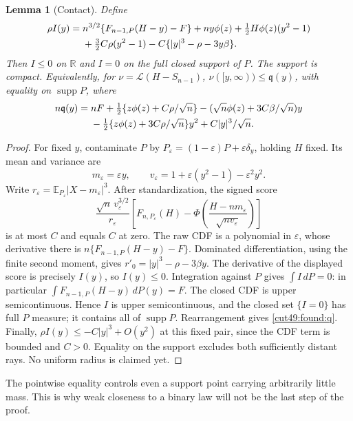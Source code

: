 \documentclass[11pt,a4paper]{article}
\numberwithin{equation}{section}
\newtheorem{lemma}[theorem]{Lemma}
\theoremstyle{definition}
\theoremstyle{remark}
\newcommand{\E}{\mathbb E}
\newcommand{\R}{\mathbb R}
\DeclareMathOperator{\supp}{supp}
\begin{document}
\begin{lemma}[Contact]\label{cut49:global:contact}\label{cut49:found:majorant}
Define
\begin{align}
 \rho I(y)={}&n^{3/2}\{F_{n-1,P}(H-y)-F\}+ny\phi(z)
 +\tfrac12H\phi(z)(y^2-1)\notag\\
 &+\tfrac32C\rho(y^2-1)-C\{|y|^3-\rho-3y\beta\}.
 \label{cut49:found:influence}
\end{align}
Then $I\le0$ on $\R$ and $I=0$ on the full closed support of $P$.
The support is compact. Equivalently, for $\nu=\mathcal L(H-S_{n-1})$,
$\nu([y,\infty))\le\mathfrak q(y)$, with equality on $\supp P$, where
\begin{align}
 n\mathfrak q(y)={}&nF+\tfrac12\{z\phi(z)+C\rho/\sqrt n\}
 -(\sqrt n\phi(z)+3C\beta/\sqrt n)y\notag\\
 &-\tfrac12\{z\phi(z)+3C\rho/\sqrt n\}y^2
 +C|y|^3/\sqrt n.\label{cut49:found:q}
\end{align}
\end{lemma}
\begin{proof}
For fixed $y$, contaminate $P$ by
$P_\varepsilon=(1-\varepsilon)P+\varepsilon\delta_y$, holding $H$ fixed.
Its mean and variance are
\[
 m_\varepsilon=\varepsilon y,\qquad
 v_\varepsilon=1+\varepsilon(y^2-1)-\varepsilon^2y^2.
\]
Write $r_\varepsilon=\E_{P_\varepsilon}|X-m_\varepsilon|^3$.
After standardization, the signed score
\[
 \frac{\sqrt n\,v_\varepsilon^{3/2}}{r_\varepsilon}
 \left[F_{n,P_\varepsilon}(H)-
 \Phi\!\left(\frac{H-nm_\varepsilon}{\sqrt{nv_\varepsilon}}\right)\right]
\]
is at most $C$ and equals $C$ at zero. The raw CDF is a polynomial
in $\varepsilon$, whose derivative there is
$n\{F_{n-1,P}(H-y)-F\}$. Dominated differentiation, using the finite
second moment, gives $r'_0=|y|^3-\rho-3\beta y$.
The derivative of the displayed score is precisely $I(y)$, so $I(y)\le0$.
Integration against $P$ gives $\int I\,dP=0$: in particular
$\int F_{n-1,P}(H-y)\,dP(y)=F$.
The closed CDF is upper semicontinuous. Hence $I$ is upper
semicontinuous, and the closed set $\{I=0\}$ has full $P$ measure;
it contains all of $\supp P$. Rearrangement gives
\eqref{cut49:found:q}. Finally,
$\rho I(y)\le-C|y|^3+O(y^2)$ at this fixed pair, since the CDF term is
bounded and $C>0$. Equality on the support excludes both sufficiently
distant rays. No uniform radius is claimed yet.
\end{proof}

The pointwise equality controls even a support point carrying arbitrarily
little mass. This is why weak closeness to a binary law will not be the
last step of the proof.
\end{document}

